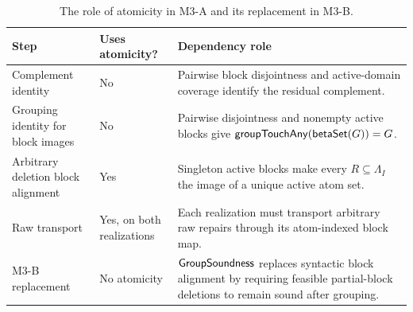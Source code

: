 \begin{table}[htbp]
\centering
\small
\begin{tabularx}{\textwidth}{@{}p{}p{}X@{}}
\toprule
Step & Uses atomicity? & Dependency role \\
\midrule
Complement identity & No & Pairwise block disjointness and active-domain coverage identify the residual complement. \\
Grouping identity for block images & No & Pairwise disjointness and nonempty active blocks give \(\mathsf{groupTouchAny}(\mathsf{betaSet}(G))=G\). \\
Arbitrary deletion block alignment & Yes & Singleton active blocks make every \(R\subseteq\Lambda_I\) the image of a unique active atom set. \\
Raw transport & Yes, on both realizations & Each realization must transport arbitrary raw repairs through its atom-indexed block map. \\
M3-B replacement & No atomicity & \(\mathsf{GroupSoundness}\) replaces syntactic block alignment by requiring feasible partial-block deletions to remain sound after grouping. \\
\bottomrule
\end{tabularx}
\caption{The role of atomicity in M3-A and its replacement in M3-B.}
\label{tab:atomicity-dependency}
\end{table}
